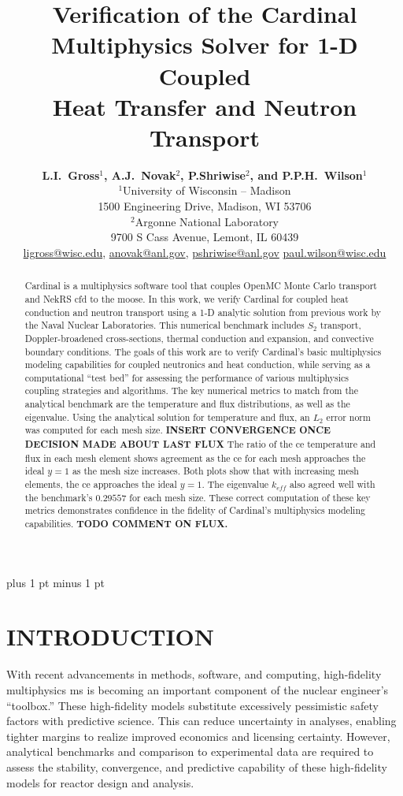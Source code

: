 \documentclass[letterpaper]{mc2023}
\title{Verification of the Cardinal Multiphysics Solver for 1-D Coupled\\
Heat Transfer and Neutron Transport}
\author{%
  \textbf{L.I.~Gross$^1$, A.J.~Novak$^2$, P.Shriwise$^2$, and P.P.H.~Wilson$^1$}\\
  $^1$University of Wisconsin -- Madison  \\
  1500 Engineering Drive, Madison, WI 53706 \vspace{6pt}\\
  $^2$Argonne National Laboratory \\
  9700 S Cass Avenue, Lemont, IL 60439\vspace{6pt} \\
  \url{ligross@wisc.edu}, \url{anovak@anl.gov}, \url{pshriwise@anl.gov} \url{paul.wilson@wisc.edu}
}
\begin{document}
\maketitle
\justify
\parskip 6pt plus 1 pt minus 1 pt

\begin{abstract}
  Cardinal is a multiphysics software tool that couples OpenMC Monte Carlo transport and NekRS \gls{cfd} to the \gls{moose}.
  In this work, we verify Cardinal for coupled heat conduction and neutron transport using a 1-D analytic solution from previous
  work by the Naval Nuclear Laboratories. This numerical benchmark includes $S_2$ transport, Doppler-broadened cross-sections,
  thermal conduction and expansion, and convective boundary conditions. The goals of this work are to verify Cardinal's basic
  multiphysics modeling capabilities for coupled neutronics and heat conduction, while serving as a computational ``test bed''
  for assessing the performance of various multiphysics coupling strategies and algorithms. The key numerical metrics to match
  from the analytical benchmark are the temperature and flux distributions, as well as the eigenvalue. Using the analytical
  solution for temperature and flux, an $L_{2}$ error norm was computed for each mesh size. \textbf{INSERT CONVERGENCE ONCE DECISION MADE ABOUT LAST FLUX}
  The ratio of the \gls{ce} temperature and flux in each mesh element shows agreement as the \gls{ce} for each mesh approaches
  the ideal $y=1$ as the mesh size increases. Both plots show that with increasing mesh elements, the \gls{ce} approaches the
  ideal $y=1$. The eigenvalue $k_{eff}$ also agreed well with the benchmark's $0.29557$ for each mesh size. These correct
  computation of these key metrics demonstrates confidence in the fidelity of Cardinal's multiphysics modeling capabilities. \textbf{TODO COMMENT ON FLUX.}
\end{abstract}
\vspace{6pt}

\section{INTRODUCTION}
\label{sec:intro}
With recent advancements in methods, software, and computing, high-fidelity multiphysics \gls{ms} is becoming an important
component of the nuclear engineer's ``toolbox.'' These high-fidelity models substitute excessively pessimistic safety factors
with predictive science. This can reduce uncertainty in analyses, enabling tighter margins to realize improved economics
and licensing certainty. However, analytical benchmarks and comparison to experimental data are required to assess the stability,
convergence, and predictive capability of these high-fidelity models for reactor design and analysis.
\end{document}
